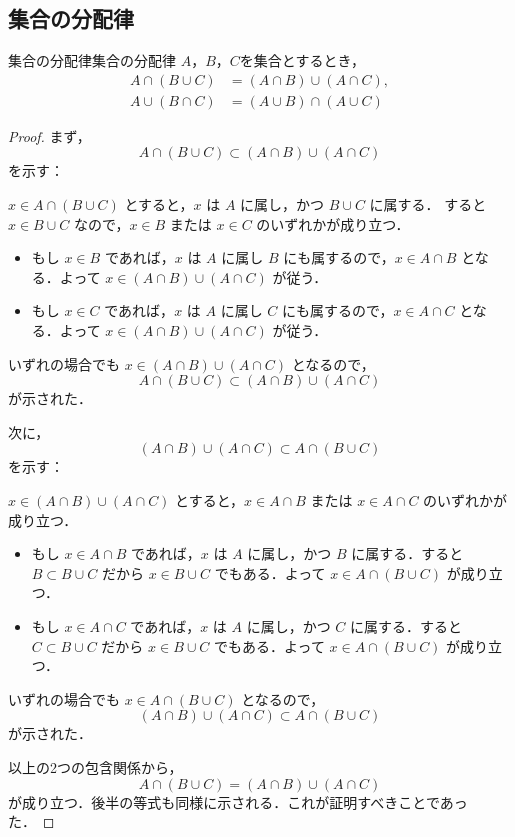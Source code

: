 \subsection{集合の分配律}

\begin{prop}{集合の分配律}{集合の分配律}
  $A$，$B$，$C$を集合とするとき，
  \begin{align*}
    A \cap ( B \cup C) & = (A \cap B) \cup (A \cap C), \\
    A \cup ( B \cap C) & = (A \cup B) \cap (A \cup C)
  \end{align*}
\end{prop}

\begin{tleftbar}
  \begin{proof}
    まず，
    \[
      A \cap (B \cup C) \subset (A \cap B) \cup (A \cap C)
    \]
    を示す：

    $x \in A \cap (B \cup C)$ とすると，$x$ は $A$ に属し，かつ $B \cup C$ に属する．
    すると $x \in B \cup C$ なので，$x \in B$ または $x \in C$ のいずれかが成り立つ．
    \begin{itemize}
      \item もし $x \in B$ であれば，$x$ は $A$ に属し $B$ にも属するので，$x \in A \cap B$ となる．よって $x \in (A \cap B) \cup (A \cap C)$ が従う．
      \item もし $x \in C$ であれば，$x$ は $A$ に属し $C$ にも属するので，$x \in A \cap C$ となる．よって $x \in (A \cap B) \cup (A \cap C)$ が従う．
    \end{itemize}
    いずれの場合でも $x \in (A \cap B) \cup (A \cap C)$ となるので，
    \[
      A \cap (B \cup C) \subset (A \cap B) \cup (A \cap C)
    \]
    が示された．

    次に，
    \[
      (A \cap B) \cup (A \cap C) \subset A \cap (B \cup C)
    \]
    を示す：

    $x \in (A \cap B) \cup (A \cap C)$ とすると，$x \in A \cap B$ または $x \in A \cap C$ のいずれかが成り立つ．
    \begin{itemize}
      \item もし $x \in A \cap B$ であれば，$x$ は $A$ に属し，かつ $B$ に属する．すると $B \subset B \cup C$ だから $x \in B \cup C$ でもある．よって $x \in A \cap (B \cup C)$ が成り立つ．
      \item もし $x \in A \cap C$ であれば，$x$ は $A$ に属し，かつ $C$ に属する．すると $C \subset B \cup C$ だから $x \in B \cup C$ でもある．よって $x \in A \cap (B \cup C)$ が成り立つ．
    \end{itemize}
    いずれの場合でも $x \in A \cap (B \cup C)$ となるので，
    \[
      (A \cap B) \cup (A \cap C) \subset A \cap (B \cup C)
    \]
    が示された．

    以上の2つの包含関係から，
    \[
      A \cap (B \cup C) =(A \cap B) \cup (A \cap C)
    \]
    が成り立つ．後半の等式も同様に示される．これが証明すべきことであった．
  \end{proof}
\end{tleftbar}

